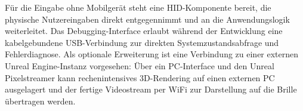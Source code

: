 Für die Eingabe ohne Mobilgerät steht eine HID-Komponente bereit, die physische Nutzereingaben direkt entgegennimmt und an die Anwendungslogik weiterleitet. Das Debugging-Interface erlaubt während der Entwicklung eine kabelgebundene \newline USB-Verbindung zur direkten Systemzustandsabfrage und Fehlerdiagnose. Als optionale Erweiterung ist eine Verbindung zu einer externen Unreal Engine-Instanz vorgesehen: Über ein PC-Interface und den Unreal Pixelstreamer kann rechenintensives 3D-Rendering auf einen externen PC ausgelagert und der fertige Videostream per WiFi zur Darstellung auf die Brille übertragen werden.

